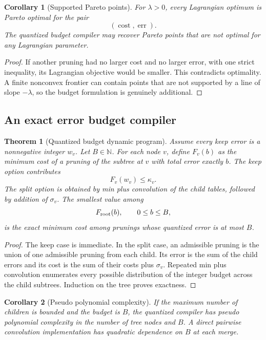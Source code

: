 \documentclass{aomart}
\newtheorem{theorem}{Theorem}[section]
\newtheorem{corollary}[corollary]{Corollary}
\theoremstyle{definition}
\theoremstyle{remark}
\newcommand{\NN}{\mathbb N}
\newcommand{\cost}{\operatorname{cost}}
\newcommand{\err}{\operatorname{err}}
\begin{document}
\begin{corollary}[Supported Pareto points]\label{cor:supported_pareto}
For \(\lambda>0\), every Lagrangian optimum is Pareto optimal for the pair
\[
(\cost,\err).
\]
The quantized budget compiler may recover Pareto points that are not optimal for any Lagrangian parameter.
\end{corollary}

\begin{proof}
If another pruning had no larger cost and no larger error, with one strict inequality, its Lagrangian objective would be smaller. This contradicts optimality. A finite nonconvex frontier can contain points that are not supported by a line of slope \(-\lambda\), so the budget formulation is genuinely additional.
\end{proof}

\subsection{An exact error budget compiler}

\begin{theorem}[Quantized budget dynamic program]\label{thm:budget_compiler}
Assume every keep error is a nonnegative integer \(w_v\). Let \(B\in\NN\). For each node \(v\), define \(F_v(b)\) as the minimum cost of a pruning of the subtree at \(v\) with total error exactly \(b\). The keep option contributes
\[
F_v(w_v)\leq\kappa_v.
\]
The split option is obtained by min plus convolution of the child tables, followed by addition of \(\sigma_v\). The smallest value among
\[
F_{\rm root}(b),
\qquad
0\leq b\leq B,
\]
is the exact minimum cost among prunings whose quantized error is at most \(B\).
\end{theorem}

\begin{proof}
The keep case is immediate. In the split case, an admissible pruning is the union of one admissible pruning from each child. Its error is the sum of the child errors and its cost is the sum of their costs plus \(\sigma_v\). Repeated min plus convolution enumerates every possible distribution of the integer budget across the child subtrees. Induction on the tree proves exactness.
\end{proof}

\begin{corollary}[Pseudo polynomial complexity]\label{cor:budget_complexity}
If the maximum number of children is bounded and the budget is \(B\), the quantized compiler has pseudo polynomial complexity in the number of tree nodes and \(B\). A direct pairwise convolution implementation has quadratic dependence on \(B\) at each merge.
\end{corollary}
\end{document}
